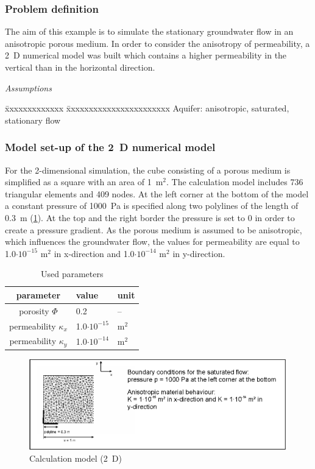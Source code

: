 
\subsubsection*{Problem definition}

The aim of this example is to simulate the stationary groundwater flow in an anisotropic porous medium. In order to consider the anisotropy of permeability, a 2~D numerical model was built which contains a higher permeability in the vertical than in the horizontal direction.

\textsl{Assumptions}

\begin{tabbing}
\=xxxxxxxxxxxxx  \=xxxxxxxxxxxxxxxxxxxxxxx \kill
\> Aquifer: \> anisotropic, saturated, stationary flow
\end{tabbing}

\subsubsection*{Model set-up of the 2~D numerical model}

For the 2-dimensional simulation, the cube consisting of a porous medium is simplified as a square with an area of 1~m$^2$. The calculation model includes 736 triangular elements and 409 nodes. At the left corner at the bottom of the model a constant pressure of 1000~Pa is specified along two polylines of the length of 0.3~m (\ref{fig23}). At the top and the right border the pressure is set to 0 in order to create a pressure gradient. As the porous medium is assumed to be anisotropic, which influences the groundwater flow, the values for permeability are equal to 1.0$\cdot 10^{-15}$ m$^2$ in x-direction and 1.0$\cdot 10^{-14}$ m$^2$ in y-direction.

\begin{table}[htbp]
\centering
\begin{tabular}{|c|l|l|}
\hline
parameter & value & unit \\
\hline
porosity $\Phi$  & 0.2 &  --  \\			
\hline
permeability $\kappa_x$ & 1.0$\cdot 10^{-15}$ & m$^2$ \\
\hline
permeability $\kappa_y$ & 1.0$\cdot 10^{-14}$ & m$^2$ \\
\hline
\end{tabular}
\caption{Used parameters}
\label{tab22}
\end{table}

\begin{figure}[htbp]
\centering
\includegraphics[width=1.0\textwidth]{H_GW/figures/fig23.eps}
\caption{Calculation model (2~D)}
\label{fig23}
\end{figure}

